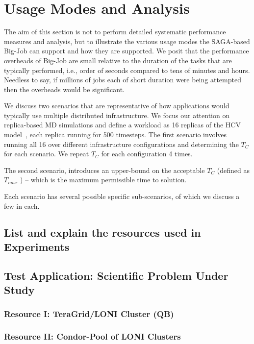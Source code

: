 \documentclass[conference,final]{IEEEtran}
\newcommand{\numrep}{16 }
\newcommand{\samplenum}{4 }
\newcommand{\tmax}{$T_{max}$ }
\newcommand{\tc}{$T_{C}$ }
\begin{document}
\section{Usage Modes and Analysis}

The aim of this section is not to perform detailed systematic
performance measures and analysis, but to illustrate the various usage
modes the SAGA-based Big-Job can support and how they are supported. We
posit that the performance overheads of Big-Job are small relative to
the duration of the tasks that are typically performed, i.e., order of
seconds compared to tens of minutes and hours.  Needless to say, if
millions of jobs each of short duration were being attempted then the
overheads would be significant.

We discuss two scenarios that are representative of how applications
would typically use multiple distributed infrastructure. We focus our
attention on replica-based MD simulations and define a workload as
\numrep replicas of the HCV model~\cite{}, each replica running for
500 timesteps.  The first scenario involves running all \numrep over
different infrastructure configurations and determining the \tc for
each scenario. We repeat \tc for each configuration \samplenum times.

The second scenario, introduces an upper-bound on the acceptable \tc
(defined as \tmax) -- which is the maximum permissible time to
solution.

Each scenario has several possible specific sub-scenarios, of which we
discuss a few in each.

\subsection{List and explain the resources used in Experiments}

\subsection{Test Application: Scientific Problem Under Study}

\subsubsection*{Resource I: TeraGrid/LONI Cluster (QB)}

\subsubsection*{Resource II: Condor-Pool of LONI Clusters}
\end{document}
